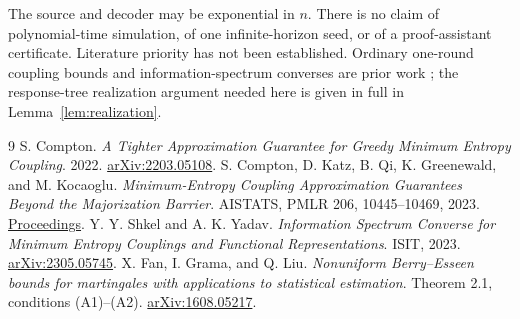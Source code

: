 \documentclass[11pt,a4paper]{article}
\begin{document}
The source and decoder may be exponential in $n$. There is no claim of
polynomial-time simulation, of one infinite-horizon seed, or of a
proof-assistant certificate. Literature priority has not been established.
Ordinary one-round coupling bounds and information-spectrum converses
are prior work \cite{C22,CKQGK23,SY23}; the response-tree realization
argument needed here is given in full in Lemma~\ref{lem:realization}.

\begin{thebibliography}{9}
 S. Compton.
\emph{A Tighter Approximation Guarantee for Greedy Minimum Entropy
Coupling}. 2022. \href{https://arxiv.org/abs/2203.05108}{arXiv:2203.05108}.
 S. Compton, D. Katz, B. Qi, K. Greenewald, and M. Kocaoglu.
\emph{Minimum-Entropy Coupling Approximation Guarantees Beyond the
Majorization Barrier}. AISTATS, PMLR 206, 10445--10469, 2023.
\href{https://proceedings.mlr.press/v206/compton23a.html}{Proceedings}.
 Y. Y. Shkel and A. K. Yadav.
\emph{Information Spectrum Converse for Minimum Entropy Couplings and
Functional Representations}. ISIT, 2023.
\href{https://arxiv.org/abs/2305.05745}{arXiv:2305.05745}.
 X. Fan, I. Grama, and Q. Liu.
\emph{Nonuniform Berry--Esseen bounds for martingales with applications
to statistical estimation}. Theorem 2.1, conditions (A1)--(A2).
\href{https://arxiv.org/abs/1608.05217}{arXiv:1608.05217}.
\end{thebibliography}
\end{document}
